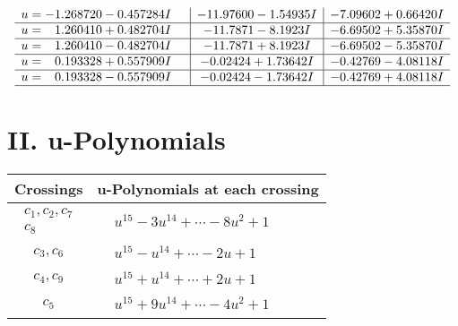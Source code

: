 \documentclass[1p]{elsarticle_modified}
\theoremstyle{definition}
\begin{document}
$$\begin{array}{c|c|c}
\begin{aligned}
u &= -1.268720 - 0.457284 I\end{aligned}
 & -11.97600 - 1.54935 I & -7.09602 + 0.66420 I \\ \hline\begin{aligned}
u &= \phantom{-}1.260410 + 0.482704 I\end{aligned}
 & -11.7871 - 8.1923 I & -6.69502 + 5.35870 I \\ \hline\begin{aligned}
u &= \phantom{-}1.260410 - 0.482704 I\end{aligned}
 & -11.7871 + 8.1923 I & -6.69502 - 5.35870 I \\ \hline\begin{aligned}
u &= \phantom{-}0.193328 + 0.557909 I\end{aligned}
 & -0.02424 + 1.73642 I & -0.42769 - 4.08118 I \\ \hline\begin{aligned}
u &= \phantom{-}0.193328 - 0.557909 I\end{aligned}
 & -0.02424 - 1.73642 I & -0.42769 + 4.08118 I\\
 \hline 
 \end{array}$$\newpage
\newpage\renewcommand{\arraystretch}{1}
\centering \section*{ II. u-Polynomials}
\begin{tabular}{m{50pt}|m{274pt}}
Crossings & \hspace{64pt}u-Polynomials at each crossing \\
\hline $$\begin{aligned}c_{1},c_{2},c_{7}\\c_{8}\end{aligned}$$&$\begin{aligned}
&u^{15}-3 u^{14}+\cdots-8 u^2+1
\end{aligned}$\\
\hline $$\begin{aligned}c_{3},c_{6}\end{aligned}$$&$\begin{aligned}
&u^{15}- u^{14}+\cdots-2 u+1
\end{aligned}$\\
\hline $$\begin{aligned}c_{4},c_{9}\end{aligned}$$&$\begin{aligned}
&u^{15}+u^{14}+\cdots+2 u+1
\end{aligned}$\\
\hline $$\begin{aligned}c_{5}\end{aligned}$$&$\begin{aligned}
&u^{15}+9 u^{14}+\cdots-4 u^2+1
\end{aligned}$\\
\hline
\end{tabular}\newpage\renewcommand{\arraystretch}{1}
\end{document}
